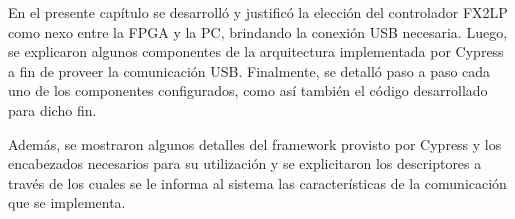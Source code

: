 En el presente capítulo se desarrolló y justificó la elección del controlador FX2LP como nexo entre la FPGA y la PC, brindando la conexión USB necesaria. Luego, se explicaron algunos componentes de la arquitectura implementada por Cypress a fin de proveer la comunicación USB. Finalmente, se detalló paso a paso cada uno de los componentes configurados, como así también el código desarrollado para dicho fin.

Además, se mostraron algunos detalles del framework provisto por Cypress y los encabezados necesarios para su utilización y se explicitaron los descriptores a través de los cuales se le informa al sistema las características de la comunicación que se implementa.